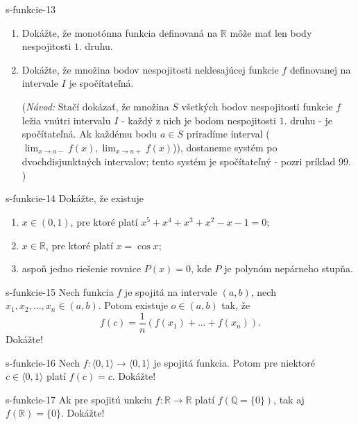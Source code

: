 	\begin{defproblem}{s-funkcie-13}
	\begin{enumerate}
	\item Dokážte, že monotónna funkcia definovaná na $\mathbb{R}$ môže mať len body nespojitosti $1.$ druhu.
	\item Dokážte, že množina bodov nespojitosti neklesajúcej funkcie $f$ definovanej na intervale $I$ je spočítateľná.
	
	(\textit{Návod:} Stačí dokázať, že množina $S$ všetkých bodov nespojitosti funkcie $f$ ležia vnútri intervalu $I$ - každý z nich je bodom nespojitosti $1.$ druhu - je spočítateľná. Ak každému bodu $a \in S$ priradíme interval ($\lim_{x \rightarrow a-}f(x),\lim_{x \rightarrow a+}f(x)$)), dostaneme systém po dvochdisjunktných intervalov; tento systém je spočítateľný - pozri príklad $99$. )
	
	\end{enumerate}
	\end{defproblem}
	
	\begin{defproblem}{s-funkcie-14}
	Dokážte, že existuje
	\begin{enumerate}
	\item $x \in (0,1)$, pre ktoré platí $x^5+x^4+x^3+x^2-x-1=0$;
	\item $x \in \mathbb{R}$, pre ktoré platí $x=\cos x$;
	\item aspoň jedno riešenie rovnice $P(x)=0$, kde $P$ je polynóm nepárneho stupňa.
	\end{enumerate}
	\end{defproblem}
	
	\begin{defproblem}{s-funkcie-15}
	Nech funkcia $f$ je spojitá na intervale $(a,b)$, nech $x_1,x_2,...,x_n \in (a,b)$. Potom existuje $o \in (a,b)$ tak, že 
	$$f(c)=\frac{1}{n}(f(x_1)+...+f(x_n)).$$ Dokážte!
	\end{defproblem}
	
	\begin{defproblem}{s-funkcie-16}
	Nech $f:\langle 0,1 \rangle \rightarrow \langle 0,1 \rangle$ je spojitá funkcia. Potom pre niektoré $c \in \langle 0,1 \rangle$ platí $f(c)=c$. Dokážte!
	\end{defproblem}
	
	\begin{defproblem}{s-funkcie-17}
	Ak pre spojitú unkciu $f: \mathbb{R} \rightarrow \mathbb{R}$ platí $f(\mathbb{Q}= \{0\})$, tak aj $f(\mathbb{R})=\{0\}$. Dokážte!
	\end{defproblem}
	
